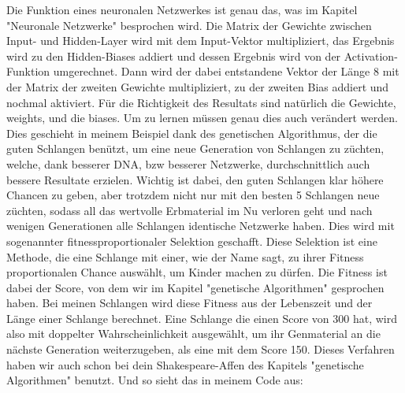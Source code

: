 \documentclass[10pt,a4paper,ngerman,english]{article}
\begin{document}
Die Funktion  eines neuronalen Netzwerkes ist genau das, was im Kapitel "Neuronale Netzwerke" besprochen wird. Die Matrix der Gewichte zwischen Input- und Hidden-Layer wird mit dem Input-Vektor multipliziert, das Ergebnis wird zu den Hidden-Biases addiert und dessen Ergebnis wird von der Activation-Funktion umgerechnet. Dann wird der dabei entstandene Vektor der Länge 8 mit der Matrix der zweiten Gewichte multipliziert, zu der zweiten Bias addiert und nochmal aktiviert. Für die Richtigkeit des Resultats sind natürlich die Gewichte, weights, und die biases. Um zu lernen müssen genau dies auch verändert werden. Dies geschieht in meinem Beispiel dank des genetischen Algorithmus, der die guten Schlangen benützt, um eine neue Generation von Schlangen zu züchten, welche, dank besserer DNA, bzw besserer Netzwerke, durchschnittlich auch bessere Resultate erzielen. Wichtig ist dabei, den guten Schlangen klar höhere Chancen zu geben, aber trotzdem nicht nur mit den besten 5 Schlangen neue züchten, sodass all das wertvolle Erbmaterial im Nu verloren geht und nach wenigen Generationen alle Schlangen identische Netzwerke haben. Dies wird mit sogenannter fitnessproportionaler Selektion geschafft. Diese Selektion ist eine Methode, die eine Schlange mit einer, wie der Name sagt, zu ihrer Fitness proportionalen Chance auswählt, um Kinder machen zu dürfen. Die Fitness ist dabei der Score, von dem wir im Kapitel "genetische Algorithmen" gesprochen haben. Bei meinen Schlangen wird diese Fitness aus der Lebenszeit und der Länge einer Schlange berechnet. Eine Schlange die einen Score von 300 hat, wird also mit doppelter Wahrscheinlichkeit ausgewählt, um ihr Genmaterial an die nächste Generation weiterzugeben, als eine mit dem Score 150. Dieses Verfahren haben wir auch schon bei dein Shakespeare-Affen des Kapitels "genetische Algorithmen" benutzt. Und so sieht 
das in meinem Code aus:
\end{document}
